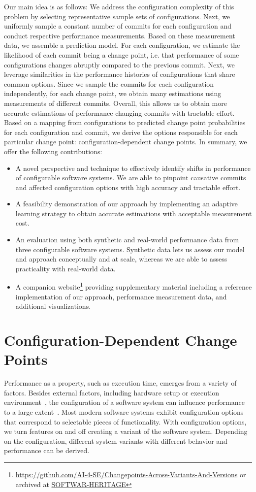 \documentclass[sigconf]{acmart}
\begin{document}
	Our main idea is as follows: We address the configuration complexity of this problem by selecting representative sample sets of configurations.
	Next, we uniformly sample a constant number of commits for each configuration and conduct respective performance measurements.
	Based on these measurement data, we assemble a prediction model.
	For each configuration, we estimate the likelihood of each commit being a change point, i.e. that performance of some configurations changes abruptly compared to the previous commit.
	Next, we leverage similarities in the performance histories of configurations that share common options.
	Since we sample the commits for each configuration independently, for each change point, we obtain many estimations using measurements of different commits.
	Overall, this allows us to obtain more accurate estimations of performance-changing commits with tractable effort.
	Based on a mapping from configurations to predicted change point probabilities for each configuration and commit, we derive the options responsible for each particular change point: configuration-dependent change points.
	In summary, we offer the following contributions:
	\begin{itemize}
		\item A {\color{red}novel perspective and} technique to effectively identify shifts in performance of configurable software systems. We are able to pinpoint causative commits and affected configuration options with high accuracy and tractable effort.
		\item A feasibility demonstration of our approach by implementing an adaptive learning strategy to obtain accurate estimations with acceptable measurement cost.
		\item An evaluation using both synthetic and real-world performance data from three configurable software systems. Synthetic data lets us assess our model and approach conceptually and at scale, whereas we are able to assess practicality with real-world data.
		\item A companion website\footnote{\url{https://github.com/AI-4-SE/Changepoints-Across-Variants-And-Versions} or archived at {\color{red}\url{SOFTWAR-HERITAGE}}} providing supplementary material including a reference implementation of our approach, performance measurement data, and additional visualizations.
	\end{itemize}

	\section{Configuration-Dependent Change Points}
	Performance as a property, such as execution time, emerges from a variety of factors.
	Besides external factors, including hardware setup or execution environment~\cite{ousterhout_always_2018}, the configuration  of a software system can influence performance to a large extent~\cite{siegmundPredictingPerformanceAutomated2012}.
	Most modern software systems exhibit configuration options that correspond to selectable pieces of functionality.
	With configuration options, we turn features on and off creating a variant of the software system.
	Depending on the configuration, different system variants with different behavior and performance can be derived.
\end{document}
